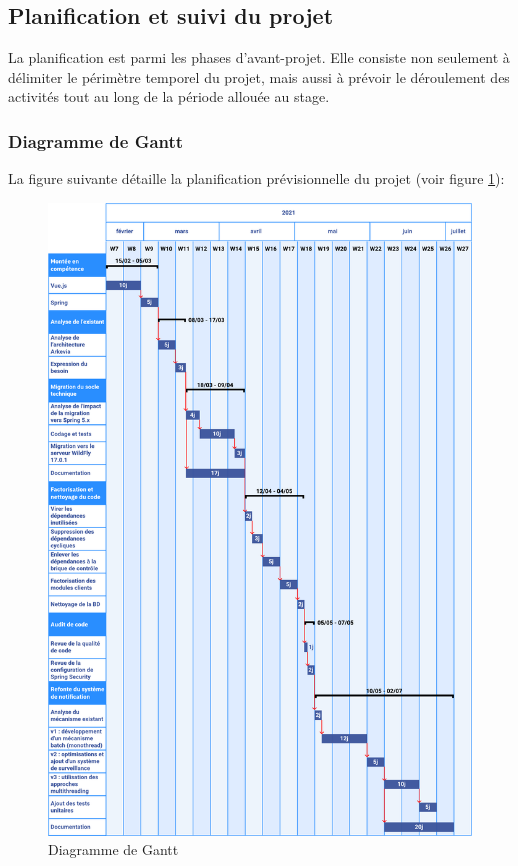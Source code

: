 \subsection{Planification et suivi du projet}
La planification est parmi les phases d'avant-projet. Elle consiste non seulement à délimiter le périmètre temporel du projet, mais aussi à prévoir le déroulement des activités tout au long de la période allouée au stage.

\subsubsection{Diagramme de Gantt}
La figure suivante détaille la planification prévisionnelle du projet (voir figure \ref{fig:gantt}):\\
\begin{figure}[H]
    \begin{center}
        \includegraphics[width=\linewidth]{images/sec3/gantt.pdf}
        \caption{Diagramme de Gantt}
        \label{fig:gantt}
    \end{center}
\end{figure}

